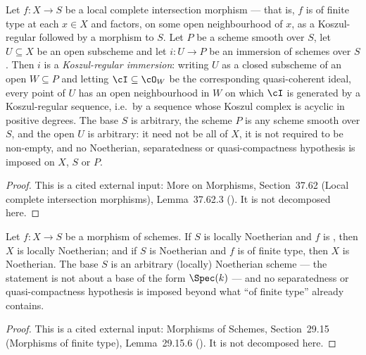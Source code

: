 \begin{lemma}
\label{lem:pc-lci-immersion-koszul}
Let $f:X\to S$ be a local complete intersection morphism --- that is,
$f$ is of finite type at each $x\in X$ and factors, on some open
neighbourhood of $x$, as a Koszul-regular
 followed by a
 morphism to $S$.  Let $P$ be a
scheme smooth over $S$, let $U\subseteq X$ be an open subscheme and let
$i:U\to P$ be an immersion of schemes over $S$.  Then $i$ is a
\emph{Koszul-regular immersion}: writing $U$ as a closed subscheme of an
open $W\subseteq P$ and letting $\cI\subseteq\cO_W$ be the corresponding
quasi-coherent ideal, every point of $U$ has an open neighbourhood in $W$
on which $\cI$ is generated by a Koszul-regular sequence, i.e.\ by a
sequence whose Koszul complex is acyclic in positive degrees.  The base
$S$ is arbitrary, the scheme $P$ is any scheme smooth over $S$, and the
open $U$ is arbitrary: it need not be all of $X$, it is not required to
be non-empty, and no Noetherian, separatedness or quasi-compactness
hypothesis is imposed on $X$, $S$ or $P$.
\end{lemma}
\begin{proof}
This is a cited external input: More on Morphisms, Section~37.62 (Local
complete intersection morphisms), Lemma~37.62.3 ().
It is not decomposed here.
\end{proof}

\begin{lemma}
\label{lem:pc-finite-type-locally-noetherian}
Let $f:X\to S$ be a morphism of schemes.  If $S$ is locally Noetherian and
$f$ is , then
$X$ is locally Noetherian; and if $S$ is Noetherian and $f$ is of finite
type, then $X$ is Noetherian.  The base $S$ is an arbitrary (locally)
Noetherian scheme --- the statement is not about a base of the form
$\Spec(k)$ --- and no separatedness or quasi-compactness hypothesis is
imposed beyond what ``of finite type'' already contains.
\end{lemma}
\begin{proof}
This is a cited external input: Morphisms of Schemes, Section~29.15
(Morphisms of finite type), Lemma~29.15.6 ().  It is
not decomposed here.
\end{proof}


